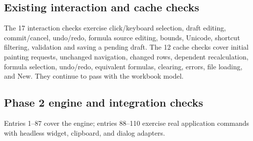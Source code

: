 \documentclass[11pt,letterpaper]{article}
\begin{document}
\subsection{Existing interaction and cache checks}
The 17 interaction checks exercise click/keyboard selection, draft editing,
commit/cancel, undo/redo, formula source editing, bounds, Unicode, shortcut
filtering, validation and saving a pending draft. The 12 cache checks cover initial
painting requests, unchanged navigation, changed rows, dependent recalculation,
formula selection, undo/redo, equivalent formulas, clearing, errors, file loading,
and New. They continue to pass with the workbook model.

\subsection{Phase 2 engine and integration checks}
Entries 1--87 cover the engine; entries 88--110 exercise real application commands
with headless widget, clipboard, and dialog adapters.
\end{document}
